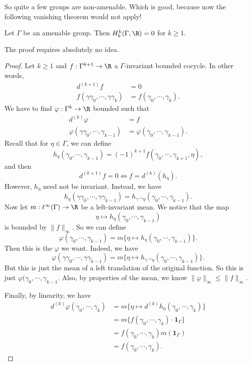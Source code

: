 \documentclass[a4paper]{article}
\begin{document}
So quite a few groups are non-amenable. Which is good, because now the following vanishing theorem would not apply!

\begin{prop}
  Let $\Gamma$ be an amenable group. Then $H^k_b(\Gamma, \R) = 0$ for $k \geq 1$.
\end{prop}

The proof requires absolutely no idea.
\begin{proof}
  Let $k \geq 1$ and $f: \Gamma^{k + 1} \to \R$ a $\Gamma$-invariant bounded cocycle. In other words,
  \begin{align*}
    d^{(k + 1)} f &= 0\\
    f(\gamma\gamma_0, \cdots, \gamma\gamma_k) &= f(\gamma_0, \cdots, \gamma_k).
  \end{align*}
  We have to find $\varphi: \Gamma^k \to \R$ bounded such that
  \begin{align*}
    d^{(k)} \varphi &= f\\
    \varphi(\gamma\gamma_0, \cdots, \gamma_{k - 1}) &= \varphi(\gamma_0, \cdots, \gamma_{k - 1}).
  \end{align*}
  Recall that for $\eta \in \Gamma$, we can define
  \[
    h_\eta (\gamma_0, \cdots, \gamma_{k - 1}) = (-1)^{k + 1} f(\gamma_0, \cdots, \gamma_{k + 1}, \eta),
  \]
  and then
  \[
    d^{(k + 1)}f = 0 \Longleftrightarrow f = d^{(k)}(h_\eta).
  \]
  However, $h_\eta$ need not be invariant. Instead, we have
  \[
    h_\eta(\gamma\gamma_0, \cdots, \gamma\gamma_{k - 1}) = h_{\gamma^{-1} \eta} (\gamma_0, \cdots, \gamma_{k - 1}).
  \]
  Now let $m : \ell^\infty(\Gamma) \to \R$ be a left-invariant mean. We notice that the map
  \[
    \eta \mapsto h_\eta (\gamma_0, \cdots, \gamma_{k - 1})
  \]
  is bounded by $\|f\|_\infty$. So we can define
  \[
    \varphi(\gamma_0, \cdots, \gamma_{k - 1}) = m \Big\{ \eta \mapsto h_\eta (\gamma_0, \cdots, \gamma_{k - 1})\Big\}.
  \]
  Then this is the $\varphi$ we want. Indeed, we have
  \[
    \varphi(\gamma \gamma_0, \cdots, \gamma \gamma_{k - 1}) = m \Big\{ \eta \mapsto h_{\gamma^{-1}\eta} (\gamma_0, \cdots, \gamma_{k - 1})\Big\}.
  \]
  But this is just the mean of a left translation of the original function. So this is just $\varphi(\gamma_0, \cdots, \gamma_{k - 1}$. Also, by properties of the mean, we know $\|\varphi\|_\infty \leq \|f\|_\infty$.

  Finally, by linearity, we have
  \begin{align*}
    d^{(k)} \varphi(\gamma_0, \cdots, \gamma_k) &= m \Big\{ \eta \mapsto d^{(k)} h_\eta (\gamma_0, \cdots, \gamma_k) \Big\}\\
    &= m \Big\{ f(\gamma_0, \cdots, \gamma_k) \cdot \mathbf{1}_\Gamma\Big\}\\
    &= f(\gamma_0, \cdots, \gamma_k) m (\mathbf{1}_\Gamma)\\
    &= f(\gamma_0, \cdots, \gamma_k).
  \end{align*}
\end{proof}
\end{document}
